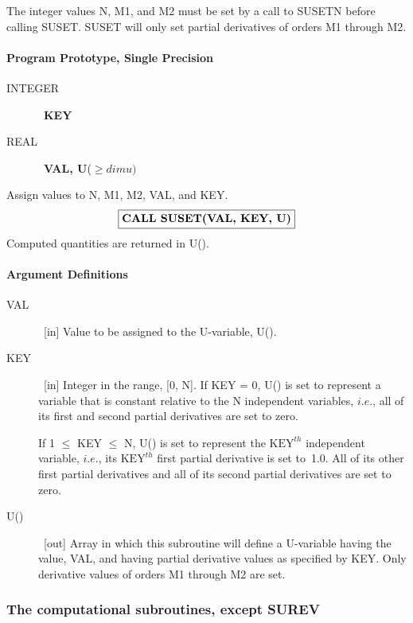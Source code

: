\documentclass[twoside]{MATH77}
\begin{document}
The integer values N, M1, and M2 must be set by a call to SUSETN
before calling SUSET.  SUSET will only set partial derivatives of orders
M1 through M2.

\paragraph{Program Prototype, Single Precision}
\begin{description}
\item[INTEGER]  \ {\bf KEY}

\item[REAL]  \ {\bf VAL, U}($\geq dimu)$\newline
[$dimu = \text{N}+1 \text{ or (N}+2)(\text{N}+1)/2$, see above.]

\end{description}

Assign values to N, M1, M2, VAL, and KEY.
$$
\fbox{{\bf CALL SUSET(VAL, KEY, U)}}
$$
Computed quantities are returned in U().

\paragraph{Argument Definitions}

\begin{description}
\item[VAL]  \ [in] Value to be assigned to the U-variable, U().

\item[KEY]  \ [in] Integer in the range, [0, N]. If KEY = 0, U() is set to
represent a variable that is constant relative to the N independent
variables, $i.e.$, all of its first and second partial derivatives are set
to zero.

If 1 $\leq $ KEY $\leq $ N, U() is set to represent the $\text{KEY}^{th}$
independent variable, $i.e.$, its $\text{KEY}^{th}$ first partial derivative is set
to~1.0. All of its other first partial derivatives and all of its second
partial derivatives are set to zero.

\item[U()]  \ [out] Array in which this subroutine will define a U-variable
having the value, VAL, and having partial derivative values as specified by
KEY. Only derivative values of orders M1 through M2 are set.
\end{description}

\subsubsection{The computational subroutines, except SUREV}
\end{document}
